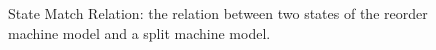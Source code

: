 \begin{figure}
%
\caption{State Match Relation: the relation between two states of the reorder  machine model and a split machine model.}
\label{fig:chapter:conlink:reorder-refines-split}
\end{figure}

